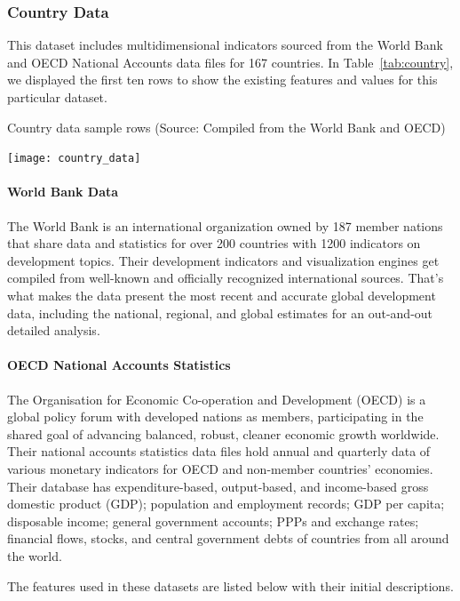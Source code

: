 \documentclass{swfuthesise}
\begin{document}
\subsubsection{Country Data}

This dataset includes multidimensional indicators sourced from the World Bank and OECD
National Accounts data files for 167 countries. In Table~\ref{tab:country}, we displayed the first ten rows to show the existing features and values for this particular dataset.

\begin{table}[!ht]
  \centering%
  \caption{Country data sample rows (Source: Compiled from the World Bank and OECD)}%
  \label{tab:country}%
  \texttt{[image: country\_data]}
\end{table}
  
\paragraph{World Bank Data}

The World Bank is an international organization owned by 187 member nations that share data and statistics for over 200 countries with 1200 indicators on development topics. Their development indicators and visualization engines get compiled from well-known and officially recognized international sources. That's what makes the data present the most recent and accurate global development data, including the national, regional, and global estimates for an out-and-out detailed analysis.

\paragraph{OECD National Accounts Statistics}

The Organisation for Economic Co-operation and Development (OECD) is a global policy forum with developed nations as members, participating in the shared goal of advancing balanced, robust, cleaner economic growth worldwide. Their national accounts statistics data files hold annual and quarterly data of various monetary indicators for OECD and non-member countries' economies. Their database has expenditure-based, output-based, and income-based gross domestic product (GDP); population and employment records; GDP per capita; disposable income; general government accounts; PPPs and exchange rates; financial flows, stocks, and central government debts of countries from all around the world.

The features used in these datasets are listed below with their initial descriptions.
\end{document}

